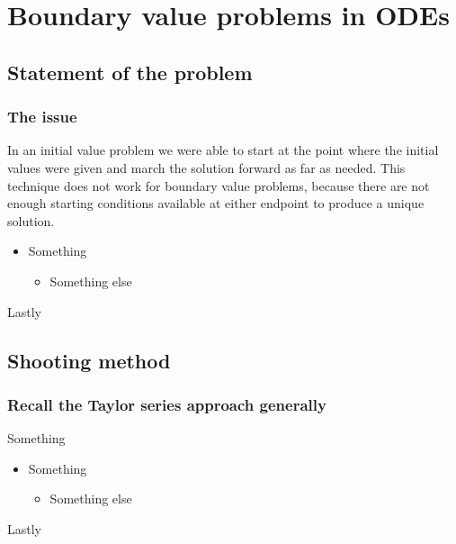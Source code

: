 \documentclass[hyperref={colorlinks=true}]{beamer}
\begin{document}
\section[Boundary value problems in ODEs]{Boundary value problems in ODEs}

\subsection[Statement of the problem]{Statement of the problem}

\begin{frame}%
  \frametitle{The issue}

  In an initial value problem we were able to start at the point where the initial values were given and march the solution forward as far as needed. This technique does not work for boundary value problems, because there are not enough starting conditions available at either endpoint to produce a unique solution.
  
  \vspace{0.3cm}
  
  \begin{itemize}
    \item Something
    \begin{itemize}
      \item Something else 
    \end{itemize}
  \end{itemize}
  
  Lastly

\end{frame}

\subsection[Shooting method]{Shooting method}

\begin{frame}%
  \frametitle{Recall the Taylor series approach generally}

  Something
  
  \vspace{0.3cm}
  
  \begin{itemize}
    \item Something
    \begin{itemize}
      \item Something else 
    \end{itemize}
  \end{itemize}
  
  Lastly

\end{frame}


\end{document}

